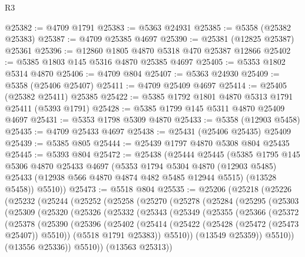 \begin{lexlean}{R3}
\begin{coremodule}
@25382 := @4709 @1791
@25383 := @5363 @24931
@25385 := @5358 (@25382 @25383)
@25387 := @4709 @25385 @4697
@25390 := @25381 (@12825 @25387) @25361
@25396 := @12860 @1805 @4870 @5318 @470 @25387 @12866
@25402 := @5385 @1803 @145 @5316 @4870 @25385 @4697
@25405 := @5353 @1802 @5314 @4870
@25406 := @4709 @804
@25407 := @5363 @24930
@25409 := @5358 (@25406 @25407)
@25411 := @4709 @25409 @4697
@25414 := @25405 (@25382 @25411) @25385
@25422 := @5385 @1792 @1801 @4870 @5313 @1791 @25411 (@5393 @1791)
@25428 := @5385 @1799 @145 @5311 @4870 @25409 @4697
@25431 := @5353 @1798 @5309 @4870
@25433 := @5358 (@12903 @5458)
@25435 := @4709 @25433 @4697
@25438 := @25431 (@25406 @25435) @25409
@25439 := @5385 @805
@25444 := @25439 @1797 @4870 @5308 @804 @25435
@25445 := @5393 @804
@25472 := @25438
    (@25444
      @25445
      (@5385
        @1795
        @145
        @5306
        @4870
        @25433
        @4697
        (@5353
          @1794
          @5304
          @4870
          (@12903 @5485)
          @25433
          (@12938 @566 @4870 @4874 @482 @5485 @12944 @5515)
          (@13528 @5458))
        @5510))
@25473 := @5518 @804
@25535 := @25206
    (@25218
      (@25226
        (@25232
          (@25244
            (@25252
              (@25258
                (@25270
                  (@25278
                    (@25284
                      (@25295
                        (@25303
                          (@25309
                            (@25320
                              (@25326
                                (@25332
                                  (@25343
                                    (@25349
                                      (@25355
                                        (@25366
                                          (@25372
                                            (@25378
                                              (@25390
                                                (@25396
                                                  (@25402
                                                    (@25414
                                                      (@25422
                                                        (@25428 (@25472 (@25473 @25407)) @5510))
                                                      (@5518 @1791 @25383))
                                                    @5510))
                                                (@13549 @25359))
                                              @5510))
                                          (@13556 @25336))
                                        @5510))
                                    (@13563 @25313))

\end{coremodule}
\end{lexlean}
